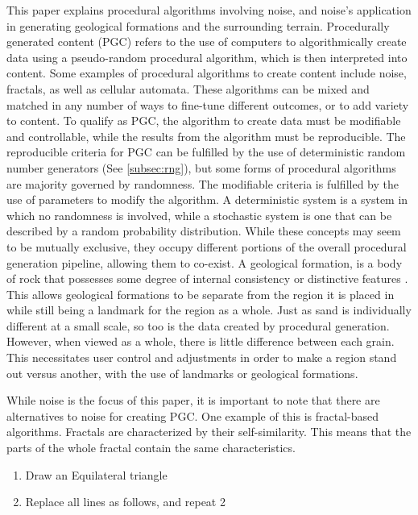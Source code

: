 \documentclass[10pt]{report}
\begin{document}
		This paper explains procedural algorithms involving noise, and noise's application in generating geological formations and the surrounding terrain. Procedurally generated content (PGC) refers to the use of computers to algorithmically create data using a pseudo-random procedural algorithm, which is then interpreted into content. Some examples of procedural algorithms to create content include noise, fractals, as well as cellular automata. These algorithms can be mixed and matched in any number of ways to fine-tune different outcomes, or to add variety to content. To qualify as PGC, the algorithm to create data must be modifiable and controllable, while the results from the algorithm must be reproducible. The reproducible criteria for PGC can be fulfilled by the use of deterministic random number generators (See \autoref{subsec:rng}), but some forms of procedural algorithms are majority governed by randomness. The modifiable criteria is fulfilled by the use of parameters to modify the algorithm. A deterministic system is a system in which no randomness is involved, while a stochastic system is one that can be described by a random probability distribution. While these concepts may seem to be mutually exclusive, they occupy different portions of the overall procedural generation pipeline, allowing them to co-exist. A geological formation, is a body of rock that possesses some degree of internal consistency or distinctive features \cite{2005}. This allows geological formations to be separate from the region it is placed in while still being a landmark for the region as a whole. Just as sand is individually different at a small scale, so too is the data created by procedural generation. However, when viewed as a whole, there is little difference between each grain. This necessitates user control and adjustments in order to make a region stand out versus another, with the use of landmarks or geological formations.
		
		While noise is the focus of this paper, it is important to note that there are alternatives to noise for creating PGC. One example of this is fractal-based algorithms. Fractals are characterized by their self-similarity. This means that the parts of the whole fractal contain the same characteristics.
		
		\begin{enumerate}
			\item Draw an Equilateral triangle
			\item Replace all lines as follows, and repeat 2
		\end{enumerate}
		
\end{document}
